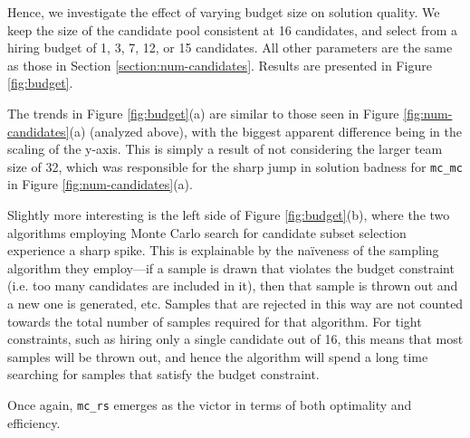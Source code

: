 Hence, we investigate the effect of varying budget size on solution quality.
We keep the size of the candidate pool consistent at 16 candidates, and select from a hiring budget of 1, 3, 7, 12, or 15 candidates.
All other parameters are the same as those in Section \ref{section:num-candidates}.
Results are presented in Figure \ref{fig:budget}.

The trends in Figure \ref{fig:budget}(a) are similar to those seen in Figure \ref{fig:num-candidates}(a) (analyzed above), with the biggest apparent difference being in the scaling of the y-axis.
This is simply a result of not considering the larger team size of 32, which was responsible for the sharp jump in solution badness for \texttt{mc\_mc} in Figure \ref{fig:num-candidates}(a).

Slightly more interesting is the left side of Figure \ref{fig:budget}(b), where the two algorithms employing Monte Carlo search for candidate subset selection experience a sharp spike.
This is explainable by the na\"iveness of the sampling algorithm they employ---if a sample is drawn that violates the budget constraint (i.e. too many candidates are included in it), then that sample is thrown out and a new one is generated, etc.
Samples that are rejected in this way are not counted towards the total number of samples required for that algorithm.
For tight constraints, such as hiring only a single candidate out of 16, this means that most samples will be thrown out, and hence the algorithm will spend a long time searching for samples that satisfy the budget constraint.

Once again, \texttt{mc\_rs} emerges as the victor in terms of both optimality and efficiency.
